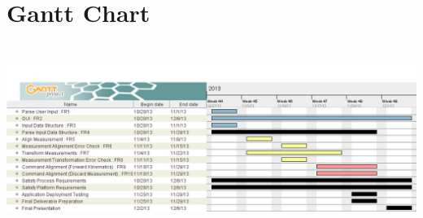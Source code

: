 \documentclass[pdftex,10pt,a4paper]{article}
\begin{document}
\section*{Gantt Chart}

\begin{center}
\begin{adjustwidth}{-1cm}{}
\includegraphics[width=185mm, height=61mm]{gantt.png}
\end{adjustwidth}
\end{center}

\newpage
\end{document}
